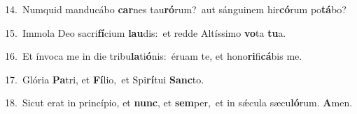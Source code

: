 {\numbfont\textcolor{\numbcolor}{14.}}~Numquid manducábo \textbf{car}\-nes tau\-\textbf{ró}\-rum?~\star aut sánguinem hir\-\textbf{có}\-rum po\-\textbf{tá}\-bo?\par
{\numbfont\textcolor{\numbcolor}{15.}}~Immola Deo sacri\-\textbf{fí}\-cium \textbf{lau}\-dis:~\star et redde Altíssimo \textbf{vo}\-ta \textbf{tu}\-a.\par
{\numbfont\textcolor{\numbcolor}{16.}}~Et ínvoca me in die tribu\-\textbf{la}\-ti\-\textbf{ó}\-nis:~\star éruam te, et hono\-\textbf{ri}\-fi\-\textbf{cá}\-bis me.\par
{\numbfont\textcolor{\numbcolor}{17.}}~Glória \textbf{Pa}\-tri, et \textbf{Fí}\-lio,~\star et Spi\-\textbf{rí}\-tui \textbf{Sanc}\-to.\par
{\numbfont\textcolor{\numbcolor}{18.}}~Sicut erat in princípio, et \textbf{nunc}\-, et \textbf{sem}\-per,~\star et in sǽcula sæcu\-\textbf{ló}\-rum. \textbf{A}\-men.\par
